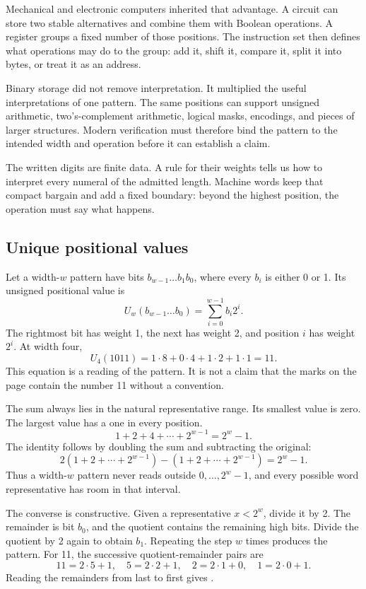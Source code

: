 Mechanical and electronic computers inherited that advantage. A circuit can
store two stable alternatives and combine them with Boolean operations. A
register groups a fixed number of those positions. The instruction set then
defines what operations may do to the group: add it, shift it, compare it,
split it into bytes, or treat it as an address.

Binary storage did not remove interpretation. It multiplied the useful
interpretations of one pattern. The same positions can support unsigned
arithmetic, two's-complement arithmetic, logical masks, encodings, and pieces
of larger structures. Modern verification must therefore bind the pattern to
the intended width and operation before it can establish a claim.

\begin{archive}[title={Place value is already an algorithmic idea}]
The written digits are finite data. A rule for their weights tells us how to
interpret every numeral of the admitted length. Machine words keep that
compact bargain and add a fixed boundary: beyond the highest position, the
operation must say what happens.
\end{archive}

\subsection{Unique positional values}

Let a width-\(w\) pattern have bits
\(b_{w-1}\ldots b_1b_0\), where every \(b_i\) is either 0 or 1. Its unsigned
positional value is
\[
  U_w(b_{w-1}\ldots b_0)=\sum_{i=0}^{w-1} b_i2^i.
\]
The rightmost bit has weight 1, the next has weight 2, and position \(i\) has
weight \(2^i\). At width four,
\[
  U_4(1011)=1\mathbin{\cdot}8+0\mathbin{\cdot}4+
  1\mathbin{\cdot}2+1\mathbin{\cdot}1=11.
\]
This equation is a reading of the pattern. It is not a claim that the marks
on the page contain the number 11 without a convention.

The sum always lies in the natural representative range. Its smallest value
is zero. The largest value has a one in every position.
\[
  1+2+4+\cdots+2^{w-1}=2^w-1.
\]
The identity follows by doubling the sum and subtracting the original:
\[
  2(1+2+\cdots+2^{w-1})-(1+2+\cdots+2^{w-1})=2^w-1.
\]
Thus a width-\(w\) pattern never reads outside
\(0,\ldots,2^w-1\), and every possible word representative has room in that
interval.

The converse is constructive. Given a representative \(x<2^w\), divide it by
2. The remainder is bit \(b_0\), and the quotient contains the remaining high
bits. Divide the quotient by 2 again to obtain \(b_1\). Repeating the step
\(w\) times produces the pattern. For 11, the successive quotient-remainder
pairs are
\[
  11=2\mathbin{\cdot}5+1,\quad
  5=2\mathbin{\cdot}2+1,\quad
  2=2\mathbin{\cdot}1+0,\quad
  1=2\mathbin{\cdot}0+1.
\]
Reading the remainders from last to first gives .

